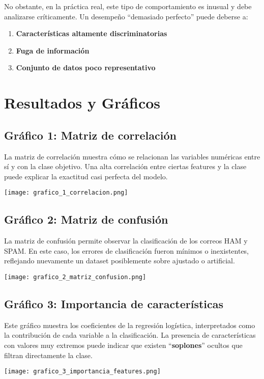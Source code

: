 \documentclass[12pt,a4paper]{article}
\begin{document}
No obstante, en la práctica real, este tipo de comportamiento es inusual y debe analizarse críticamente. Un desempeño ``demasiado perfecto'' puede deberse a:  

\begin{enumerate}
    \item \textbf{Características altamente discriminatorias}
    \item \textbf{Fuga de información} 
    \item \textbf{Conjunto de datos poco representativo}
\end{enumerate}

\newpage
\section{Resultados y Gráficos}

\subsection{Gráfico 1: Matriz de correlación}
La matriz de correlación muestra cómo se relacionan las variables numéricas entre sí y con la clase objetivo. Una alta correlación entre ciertas features y la clase puede explicar la exactitud casi perfecta del modelo.

\texttt{[image: grafico\_1\_correlacion.png]}

\subsection{Gráfico 2: Matriz de confusión}
La matriz de confusión permite observar la clasificación de los correos HAM y SPAM. En este caso, los errores de clasificación fueron mínimos o inexistentes, reflejando nuevamente un dataset posiblemente sobre ajustado o artificial.

\texttt{[image: grafico\_2\_matriz\_confusion.png]}

\subsection{Gráfico 3: Importancia de características}
Este gráfico muestra los coeficientes de la regresión logística, interpretados como la contribución de cada variable a la clasificación. La presencia de características con valores muy extremos puede indicar que existen ``\textbf{soplones}'' ocultos que filtran directamente la clase.

\texttt{[image: grafico\_3\_importancia\_features.png]}
\end{document}
